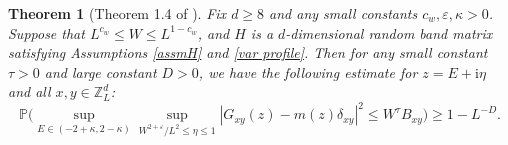\documentclass{article}
\newcommand{\1}{\mathds{1}}
\numberwithin{equation}{section}
\newcommand{\be}{\begin{equation}}
\newcommand{\ee}{\end{equation}}
\newcommand{\e}{{\varepsilon}}
\newcommand{\ii}{\mathrm{i}} %
\renewcommand{\leq}{\leqslant}
\renewcommand{\geq}{\geqslant}
\renewcommand{\le}{\leq}
\renewcommand{\ge}{\geq}
\renewcommand{\P}{\mathbb{P}}
\newcommand{\Z}{\mathbb{Z}}
\DeclareMathOperator{\OO}{O}
\theoremstyle{plain} %
\newtheorem{theorem}{Theorem}[section]
\theoremstyle{remark}
\newcommand{\cor}{\color{red}}
\newcommand{\nc}{\normalcolor}
\begin{document}
\begin{theorem}[Theorem 1.4 of \cite{PartI_high}] %
	\label{main thm}
Fix $d\ge 8$ and any small constants $ c_w, \e, \kappa>0$. Suppose that $L^{c_w} \le W \le L^{1-c_w}$, and $H$ is a $d$-dimensional random band matrix satisfying Assumptions \ref{assmH} and \ref{var profile}. Then for any small constant $\tau>0$ and large constant $D>0$, we have the following estimate for $z=E+\ii \eta$ and all $x,y \in \Z_{L}^d$: %
	\be\label{locallaw}
	\P\bigg(\sup_{E\in (-2+\kappa, 2- \kappa)}\sup_{W^{2+\e}/L^{2}\le \eta\le 1} |G_{xy} (z) -m(z)\delta_{xy}|^2 \le  W^\tau B_{xy}\bigg) \ge 1- L^{-D} . %
	\ee
\end{theorem}
\end{document}
